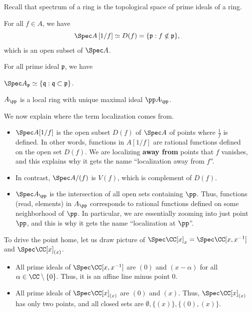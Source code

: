 Recall that spectrum of a ring is the topological space
of prime ideals of a ring.
\begin{corollary}
    For all $f\in A$, we have
    $$\Spec A\left[1/f\right]
    \simeq D(f) = \{\mathfrak p : f\notin\mathfrak p\},$$
    which is an open subset of $\Spec A$.
\end{corollary}
\begin{corollary}
    For all prime ideal $\mathfrak p$,
    we have 
    \begin{alphenum}
    \item $\Spec A_{\mathfrak p}
    \simeq \{\mathfrak q : \mathfrak q \subset\mathfrak p\}$.
    \item $A_\pp$ is a local ring with unique maximal ideal
    $\pp A_\pp$.
    \end{alphenum}
\end{corollary}
We now explain where the term localization comes from.
\begin{itemize}
    \item $\Spec A[1/f]$ is the open subset $D(f)$ of $\Spec A$ of points where $\tfrac 1f$ is defined. 
    In other words, functions in $A[1/f]$ are rational functions
    defined on the open set $D(f)$.
    We are localizing \textbf{away from}
    points that $f$ vanishes, and this explains
    why it gets the name ``localization away from $f$''.
    \item In contrast, $\Spec A/(f)$ is $V(f)$,
    which is complement of $D(f)$.
    \item $\Spec A_\pp$ is the intersection 
    of all open sets containing $\pp$.
    Thus, functions (read, elements) in $A_\pp$ 
    corresponds to rational functions 
    defined on some neighborhood of $\pp$.
    In particular, we are essentially zooming into 
    just point $\pp$, and this is why it gets the name
    ``localization at $\pp$''.
\end{itemize}
To drive the point home, let us draw picture of 
$\Spec \CC[x]_x = \Spec \CC[x,x^{-1}]$
and $\Spec \CC[x]_{(x)}$.
\begin{itemize}
\item All prime ideals of $\Spec \CC[x,x^{-1}]$
are $(0)$ and $(x-\alpha)$ for all $\alpha\in\CC\setminus\{0\}$.
Thus, it is an affine line minus point $0$.
\item All prime ideals of $\Spec \CC[x]_{(x)}$
are $(0)$ and $(x)$. 
Thus, $\Spec\CC[x]_{(x)}$ has only two points,
and all closed sets are $\emptyset, \{(x)\}, \{(0), (x)\}$.
\end{itemize}
